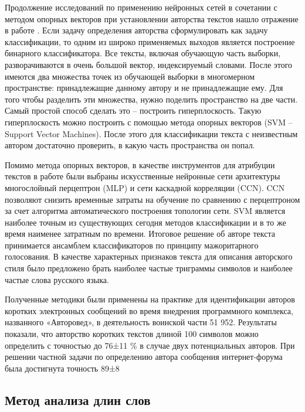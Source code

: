Продолжение исследований по применению нейронных сетей в сочетании с методом опорных векторов при установлении авторства текстов нашло отражение в работе \cite{avtoroved}. Если задачу определения авторства сформулировать как задачу классификации, то одним из широко применяемых выходов является построение бинарного классификатора. Все тексты, включая обучающую часть выборки, разворачиваются в очень большой вектор, индексируемый словами. После этого имеются два множества точек из обучающей выборки в многомерном пространстве: принадлежащие данному автору и не принадлежащие ему. Для того чтобы разделить эти множества, нужно поделить пространство на две части. Самый простой способ сделать это – построить гиперплоскость. Такую гиперплоскость можно построить с помощью метода опорных векторов (SVM – Support Vector Machines). После этого для классификации текста с неизвестным автором достаточно проверить, в какую часть пространства он попал.

Помимо метода опорных векторов, в качестве инструментов для атрибуции текстов в работе \cite{avtoroved} были выбраны искусственные нейронные сети архитектуры многослойный перцептрон (MLP) и сети каскадной корреляции (CCN). CCN позволяют снизить временные затраты на обучение по сравнению с перцептроном за счет алгоритма автоматического построения топологии сети. SVM является наиболее точным из существующих сегодня методов классификации и в то же время наименее затратным по времени. Итоговое решение об авторе текста принимается ансамблем классификаторов по принципу мажоритарного голосования. В качестве характерных признаков текста для описания авторского стиля было предложено брать наиболее частые триграммы символов и наиболее частые слова русского языка.

Полученные методики были применены на практике для идентификации авторов коротких электронных сообщений во время внедрения программного комплекса, названного «Авторовед»,  в деятельность воинской части 51 952. Результаты показали, что авторство коротких текстов длиной 100 символов можно определить с точностью до 76±11 \% в случае двух потенциальных авторов. При решении частной задачи по определению автора сообщения интернет-форума была достигнута точность 89±8 %

\subsection{Метод анализа длин слов}

